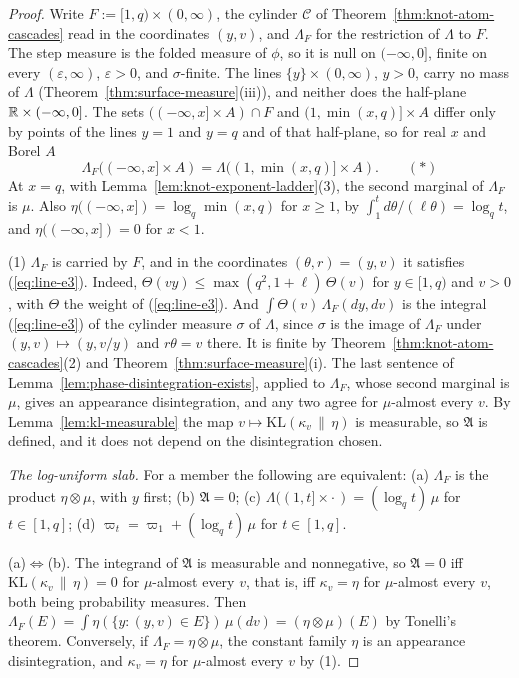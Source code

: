 \begin{proof}
Write $F := [1,q) \times (0,\infty)$, the cylinder $\mathcal{C}$ of
Theorem~\ref{thm:knot-atom-cascades} read in the coordinates $(y, v)$, and $\Lambda_F$ for the
restriction of $\Lambda$ to $F$. The step measure is the folded \Levy{} measure of $\phi$, so it is
null on $(-\infty,0]$, finite on every $(\varepsilon,\infty)$, $\varepsilon > 0$, and
$\sigma$-finite. The lines $\{y\} \times (0,\infty)$, $y > 0$, carry no mass of $\Lambda$
(Theorem~\ref{thm:surface-measure}(iii)), and neither does the half-plane $\mathbb{R} \times (-\infty,0]$.
The sets $((-\infty,x] \times A) \cap F$ and $(1, \min(x,q)] \times A$ differ only by points of the
lines $y = 1$ and $y = q$ and of that half-plane, so for real $x$ and Borel $A$
\[
  \Lambda_F((-\infty,x] \times A) = \Lambda((1, \min(x,q)] \times A). \qquad (*)
\]
At $x = q$, with Lemma~\ref{lem:knot-exponent-ladder}(3), the second marginal of $\Lambda_F$ is
$\mu$. Also $\eta((-\infty,x]) = \log_q\min(x,q)$ for $x \ge 1$, by
$\int_1^td\theta/(\ell\theta) = \log_qt$, and $\eta((-\infty,x]) = 0$ for $x < 1$.

(1) $\Lambda_F$ is carried by $F$, and in the coordinates $(\theta, r) = (y, v)$ it satisfies
(\ref{eq:line-e3}). Indeed, $\Theta(vy) \le \max(q^2, 1 + \ell)\,\Theta(v)$ for $y \in [1,q)$ and
$v > 0$, with $\Theta$ the weight of (\ref{eq:line-e3}). And $\int\Theta(v)\,\Lambda_F(dy, dv)$ is
the integral (\ref{eq:line-e3}) of the cylinder measure $\sigma$ of $\Lambda$, since $\sigma$ is the
image of $\Lambda_F$ under $(y, v) \mapsto (y, v/y)$ and $r\theta = v$ there. It is finite by
Theorem~\ref{thm:knot-atom-cascades}(2) and Theorem~\ref{thm:surface-measure}(i). The last sentence
of Lemma~\ref{lem:phase-disintegration-exists}, applied to $\Lambda_F$, whose second marginal is
$\mu$, gives an appearance disintegration, and any two agree for $\mu$-almost every $v$. By
Lemma~\ref{lem:kl-measurable} the map $v \mapsto \mathrm{KL}(\kappa_v \,\|\, \eta)$ is measurable,
so $\mathfrak{A}$ is defined, and it does not depend on the disintegration chosen.

\emph{The log-uniform slab.} For a member the following are equivalent: (a) $\Lambda_F$ is the
product $\eta \otimes \mu$, with $y$ first; (b) $\mathfrak{A} = 0$; (c)
$\Lambda((1,t] \times \cdot\,) = (\log_qt)\,\mu$ for $t \in [1,q]$; (d)
$\varpi_t = \varpi_1 + (\log_qt)\,\mu$ for $t \in [1,q]$.

(a)$\Leftrightarrow$(b). The integrand of $\mathfrak{A}$ is measurable and nonnegative, so
$\mathfrak{A} = 0$ iff $\mathrm{KL}(\kappa_v \,\|\, \eta) = 0$ for $\mu$-almost every $v$, that is,
iff $\kappa_v = \eta$ for $\mu$-almost every $v$, both being probability measures. Then
$\Lambda_F(E) = \int\eta(\{y : (y,v) \in E\})\,\mu(dv) = (\eta \otimes \mu)(E)$ by Tonelli's
theorem. Conversely, if $\Lambda_F = \eta \otimes \mu$, the constant family $\eta$ is an appearance
disintegration, and $\kappa_v = \eta$ for $\mu$-almost every $v$ by (1).


\end{proof}

